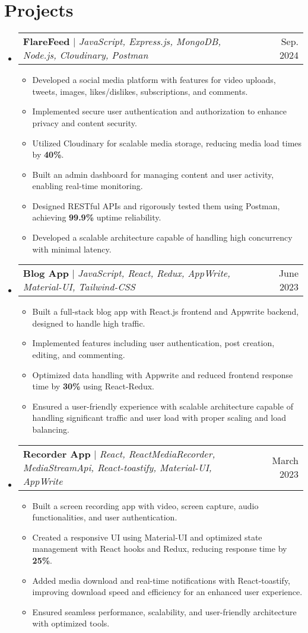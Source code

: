 \documentclass[letterpaper,10pt]{article}
\makeatletter
\newcommand{\resumeItem}[1]{\item\small{#1 \vspace{-2pt}}}
\newcommand{\resumeProjectHeading}[2]{\item\begin{tabular*}{0.98\textwidth}{l@{\extracolsep{\fill}}r}\small#1 & #2 \\ \end{tabular*}\vspace{-5pt}}
\newcommand{\resumeSubHeadingListStart}{\begin{itemize}[leftmargin=0.1in, label={}]}
\newcommand{\resumeSubHeadingListEnd}{\end{itemize}}
\newcommand{\resumeItemListStart}{\begin{itemize}}
\newcommand{\resumeItemListEnd}{\end{itemize}\vspace{-5pt}}
\makeatother
\begin{document}
\section{Projects}
\resumeSubHeadingListStart
\resumeProjectHeading
    {\textbf{FlareFeed} $|$ \emph{JavaScript, Express.js, MongoDB, Node.js, Cloudinary, Postman}}{Sep. 2024}
    \resumeItemListStart
        \resumeItem{Developed a social media platform with features for video uploads, tweets, images, likes/dislikes, subscriptions, and comments.}
        \resumeItem{Implemented secure user authentication and authorization to enhance privacy and content security.}
        \resumeItem{Utilized Cloudinary for scalable media storage, reducing media load times by \textbf{40\%}.}
        \resumeItem{Built an admin dashboard for managing content and user activity, enabling real-time monitoring.}
        \resumeItem{Designed RESTful APIs and rigorously tested them using Postman, achieving \textbf{99.9\%} uptime reliability.}
        \resumeItem{Developed a scalable architecture capable of handling high concurrency with minimal latency.}
    \resumeItemListEnd

    \resumeProjectHeading
    {\textbf{Blog App} $|$ \emph{JavaScript, React, Redux, AppWrite, Material-UI, Tailwind-CSS}}{June 2023}
    \resumeItemListStart
        \resumeItem{Built a full-stack blog app with React.js frontend and Appwrite backend, designed to handle high traffic.}
        \resumeItem{Implemented features including user authentication, post creation, editing, and commenting.}
        \resumeItem{Optimized data handling with Appwrite and reduced frontend response time by \textbf{30\%} using React-Redux.}
        \resumeItem{Ensured a user-friendly experience with scalable architecture capable of handling significant traffic and user load with proper scaling and load balancing.}
    \resumeItemListEnd

    \resumeProjectHeading
    {\textbf{Recorder App} $|$ \emph{React, ReactMediaRecorder, MediaStreamApi, React-toastify, Material-UI, AppWrite}}{March 2023}
    \resumeItemListStart
        \resumeItem{Built a screen recording app with video, screen capture, audio functionalities, and user authentication.}
        \resumeItem{Created a responsive UI using Material-UI and optimized state management with React hooks and Redux, reducing response time by \textbf{25\%}.}
        \resumeItem{Added media download and real-time notifications with React-toastify, improving download speed and efficiency for an enhanced user experience.}
        \resumeItem{Ensured seamless performance, scalability, and user-friendly architecture with optimized tools.}
    \resumeItemListEnd
\resumeSubHeadingListEnd
\end{document}
